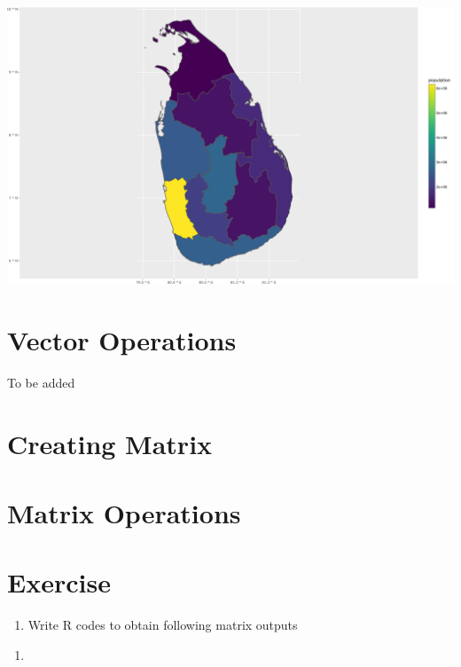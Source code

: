 \documentclass[
  letterpaper,
  DIV=11,
  numbers=noendperiod]{scrreprt}
\providecommand{\tightlist}{%
  \setlength{\itemsep}{0pt}\setlength{\parskip}{0pt}}\usepackage{longtable,booktabs,array}
\begin{document}
\includegraphics{chap2_files/figure-pdf/unnamed-chunk-30-1.pdf}

\hypertarget{vector-operations}{%
\section{Vector Operations}\label{vector-operations}}

To be added

\hypertarget{creating-matrix}{%
\section{Creating Matrix}\label{creating-matrix}}

\hypertarget{matrix-operations}{%
\section{Matrix Operations}\label{matrix-operations}}

\hypertarget{exercise-2}{%
\section{Exercise}\label{exercise-2}}

\begin{enumerate}
\def\labelenumi{\roman{enumi}.}
\tightlist
\item
  Write R codes to obtain following matrix outputs
\end{enumerate}

\begin{enumerate}
\def\labelenumi{\alph{enumi}.}
\tightlist
\item
\end{enumerate}
\end{document}

